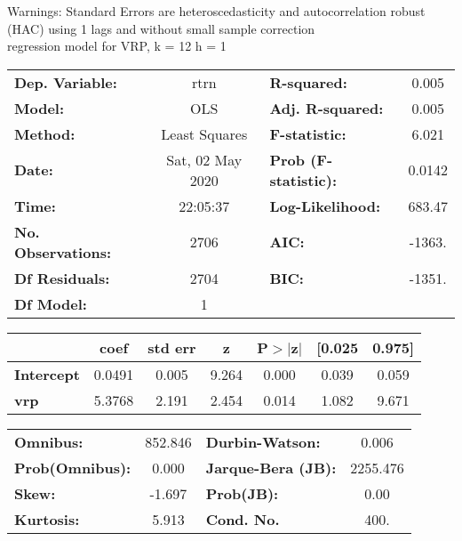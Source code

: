 Warnings: \newline
 [1] Standard Errors are heteroscedasticity and autocorrelation robust (HAC) using 1 lags and without small sample correction\\ 

regression model for VRP, k = 12 h = 1\begin{center}
\begin{tabular}{lclc}
\toprule
\textbf{Dep. Variable:}    &       rtrn       & \textbf{  R-squared:         } &     0.005   \\
\textbf{Model:}            &       OLS        & \textbf{  Adj. R-squared:    } &     0.005   \\
\textbf{Method:}           &  Least Squares   & \textbf{  F-statistic:       } &     6.021   \\
\textbf{Date:}             & Sat, 02 May 2020 & \textbf{  Prob (F-statistic):} &   0.0142    \\
\textbf{Time:}             &     22:05:37     & \textbf{  Log-Likelihood:    } &    683.47   \\
\textbf{No. Observations:} &        2706      & \textbf{  AIC:               } &    -1363.   \\
\textbf{Df Residuals:}     &        2704      & \textbf{  BIC:               } &    -1351.   \\
\textbf{Df Model:}         &           1      & \textbf{                     } &             \\
\bottomrule
\end{tabular}
\begin{tabular}{lcccccc}
                   & \textbf{coef} & \textbf{std err} & \textbf{z} & \textbf{P$> |$z$|$} & \textbf{[0.025} & \textbf{0.975]}  \\
\midrule
\textbf{Intercept} &       0.0491  &        0.005     &     9.264  &         0.000        &        0.039    &        0.059     \\
\textbf{vrp}       &       5.3768  &        2.191     &     2.454  &         0.014        &        1.082    &        9.671     \\
\bottomrule
\end{tabular}
\begin{tabular}{lclc}
\textbf{Omnibus:}       & 852.846 & \textbf{  Durbin-Watson:     } &    0.006  \\
\textbf{Prob(Omnibus):} &   0.000 & \textbf{  Jarque-Bera (JB):  } & 2255.476  \\
\textbf{Skew:}          &  -1.697 & \textbf{  Prob(JB):          } &     0.00  \\
\textbf{Kurtosis:}      &   5.913 & \textbf{  Cond. No.          } &     400.  \\
\bottomrule
\end{tabular}
\end{center}

